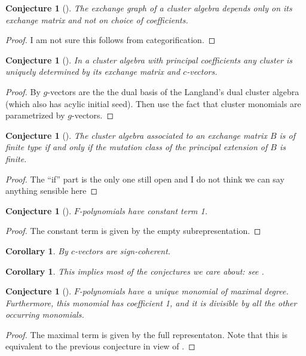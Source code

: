 \documentclass[12pt]{amsart}
\newtheorem{corollary}[theorem]{Corollary}
\newtheorem{conjecture}[theorem]{Conjecture}
\begin{document}
\begin{conjecture}[{\cite[Conjecture 4.14(1)]{FZ03}}]
  The exchange graph of a cluster algebra depends only on its exchange matrix and not on choice of coefficients.
\end{conjecture}
\begin{proof}
  I am not sure this follows from categorification.
\end{proof}

\begin{conjecture}[{\cite[Conjecture 4.7]{fomin-zelevinsky4}}]
  In a cluster algebra with principal coefficients any cluster is uniquely determined by its exchange matrix and $c$-vectors.
\end{conjecture}
\begin{proof}
  By \cite{NZ12} $g$-vectors are the the dual basis of the Langland's dual cluster algebra (which also has acylic initial seed). 
  Then use the fact that cluster monomials are parametrized by $g$-vectors.
\end{proof}

\begin{conjecture}[{\cite[Conjecture 4.8]{fomin-zelevinsky4}}]
  The cluster algebra associated to an exchange matrix $B$ is of finite type if and only if the mutation class of the principal extension of $B$ is finite.
\end{conjecture}
\begin{proof}
  The ``if'' part is the only one still open and I do not think we can say anything sensible here
\end{proof}

\begin{conjecture}[{\cite[Conjecture 5.4]{fomin-zelevinsky4}}]
  $F$-polynomials have constant term 1.
\end{conjecture}
\begin{proof}
  The constant term is given by the empty subrepresentation.
\end{proof}
\begin{corollary}
  By \cite[Proposition 5.6]{fomin-zelevinsky4} $c$-vectors are sign-coherent.
\end{corollary}
\begin{corollary}
  This implies most of the conjectures we care about: see \cite[Proposition 4.2]{NZ12}.
\end{corollary}

\begin{conjecture}[{\cite[Conjecture 5.5]{fomin-zelevinsky4}}]
  $F$-polynomials have  a unique monomial of maximal degree. 
  Furthermore, this monomial has coefficient 1, and it is divisible by all the other occurring monomials.
\end{conjecture}
\begin{proof}
  The maximal term is given by the full representaton.
  Note that this is equivalent to the previous conjecture in view of \cite[Proposition 5.3]{fomin-zelevinsky4}.
\end{proof}
\end{document}
